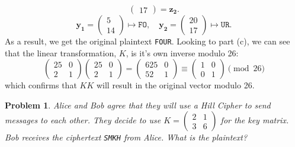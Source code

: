 \documentclass[12pt]{article}
\newenvironment{answer}
    {\begin{adjustwidth}{0pt}{0pt}}
    {\end{adjustwidth}}
\newtheorem{problem}{Problem}
\theoremstyle{remark}  %
\begin{document}
\begin{answer}
$$\begin{pmatrix}
                17
            \end{pmatrix} = \mathbf{z_2}
        .$$$$\mathbf{y_1} = \begin{pmatrix}
            5 \\
            14
        \end{pmatrix} \mapsto \texttt{FO},\quad\mathbf{y_2} = \begin{pmatrix}
            20 \\
            17
        \end{pmatrix} \mapsto \texttt{UR}.$$ As a result, we get the original plaintext \texttt{FOUR}. Looking to part (c), we can see that the linear transformation, $K$, is it's own inverse modulo 26: $$
            \begin{pmatrix}
                25 & 0 \\
                2 & 1
            \end{pmatrix}
            \begin{pmatrix}
                25 & 0 \\
                2 & 1
            \end{pmatrix} = 
            \begin{pmatrix}
                625 & 0 \\
                52 & 1
            \end{pmatrix} \equiv
            \begin{pmatrix}
                1 & 0 \\
                0 & 1
            \end{pmatrix} \pmod{26}
        $$ which confirms that $KK$ will result in the original vector modulo 26.
    \end{answer}
\vspace{5pt}
    \begin{problem}
        Alice and Bob agree that they will use a Hill Cipher to send messages to each other. They decide to use $K=\begin{pmatrix}
            2 & 1 \\
            3 & 6
        \end{pmatrix}$ for the key matrix. Bob receives the ciphertext \texttt{SMKH} from Alice. What is the plaintext?
    \end{problem}
\end{document}
